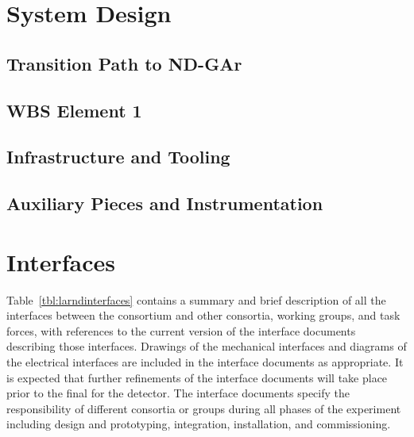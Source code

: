 \section{System Design}
\label{sec:tms-des}

\subsection{Transition Path to ND-GAr}
\label{sec:tms-des-path}


\subsection{WBS Element 1}
\label{sec:tms-des-wbs1}

\subsection{Infrastructure and Tooling}
\label{sec:tms-des-infr}

\subsection{Auxiliary Pieces and Instrumentation}
\label{sec:tms-des-aux}

\section{Interfaces}
\label{sec:tms-interface}

Table~\ref{tbl:larndinterfaces} contains a summary and brief description of all the interfaces between the  consortium and other consortia, working groups, and task forces, with references to the current version of the interface documents describing those interfaces.  
Drawings of the mechanical interfaces and diagrams of the electrical interfaces are 
included in the interface documents as appropriate.
It is expected that further refinements of the interface documents will take place prior to the final  for the detector. The interface documents specify the responsibility of different consortia or groups during all phases of the experiment including design and prototyping, integration,  installation, and  commissioning.


